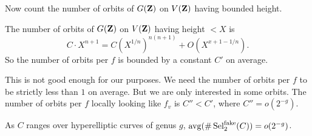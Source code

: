 Now count the number of orbits of $G(\mathbf{Z})$ on $V(\mathbf{Z})$ having bounded height. 

\begin{theo}
The number of orbits of $G(\mathbf{Z})$ on $V(\mathbf{Z})$ having height $<X$ is 
\[
  C\cdot X^{n+1} = C(X^{1/n})^{n(n+1)} + O(X^{x+1-1/n}) .
\]
So the number of orbits per $f$ is bounded by a constant $C'$ on average. 
\end{theo}

This is not good enough for our purposes. We need the number of orbits per 
$f$ to be strictly less than $1$ on average. But we are only interested in 
some orbits. The number of orbits per $f$ locally looking like $f_v$ is 
$C''<C'$, where $C''=o(2^{-g})$. 

\begin{coro}
As $C$ ranges over hyperelliptic curves of genus $g$, 
$\operatorname{avg}(\#\operatorname{Sel}_2^\mathrm{fake}(C)) = o(2^{-g})$. 
\end{coro}





